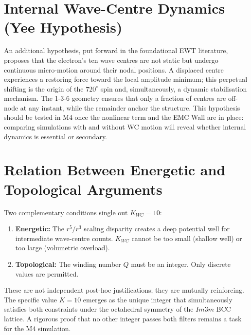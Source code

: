 \documentclass[11pt,a4paper]{article}
\begin{document}
	\section{Internal Wave-Centre Dynamics (Yee Hypothesis)}
	
	An additional hypothesis, put forward in the foundational EWT
	literature, proposes that the electron's ten wave centres are not
	static but undergo continuous micro-motion around their nodal
	positions.  A displaced centre experiences a restoring force toward
	the local amplitude minimum; this perpetual shifting is the origin of
	the $720^{\circ}$ spin and, simultaneously, a dynamic stabilisation
	mechanism.  The 1-3-6 geometry ensures that only a fraction of
	centres are off-node at any instant, while the remainder anchor the
	structure.  This hypothesis should be tested in M4 once the nonlinear
	term and the EMC Wall are in place: comparing simulations with and
	without WC motion will reveal whether internal dynamics is essential
	or secondary.
	
	\section{Relation Between Energetic and Topological Arguments}
	
	Two complementary conditions single out $K_{WC}=10$:
	
	\begin{enumerate}
		\item \textbf{Energetic:} The $r^{5}/r^{3}$ scaling disparity creates
		a deep potential well for intermediate wave-centre counts.  $K_{WC}$
		cannot be too small (shallow well) or too large (volumetric
		overload).
		\item \textbf{Topological:} The winding number $Q$ must be an integer.
		Only discrete values are permitted.
	\end{enumerate}
	
	These are not independent post-hoc justifications; they are mutually
	reinforcing.  The specific value $K=10$ emerges as the unique integer
	that simultaneously satisfies both constraints under the octahedral
	symmetry of the $Im\bar{3}m$ BCC lattice.  A rigorous proof that no
	other integer passes both filters remains a task for the M4 simulation.
	
\end{document}
